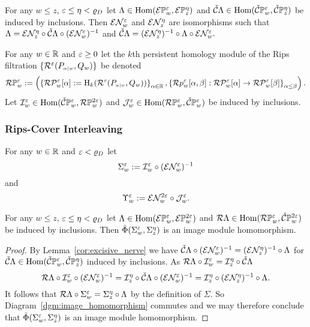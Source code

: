 \begin{lemma}\label{cor:excisive_nerve}
  For any $w\leq z$, $\e\leq \eta < \varrho_D$ let $\Lambda\in\Hom(\E\PP{w}{\e},\E\PP{z}{\eta})$ and $\cech\Lambda\in\Hom(\CPP{w}{\e},\CPP{z}{\eta})$ be induced by inclusions.
  Then $\E\N_w^\e$ and $\E\N_z^\eta$ are isomorphisms such that $\Lambda = \E\N_{z}^{\eta}\circ \cech\Lambda\circ (\E\N_w^\e)^{-1}$ and $\cech\Lambda = (\E\N_{z}^{\eta})^{-1}\circ \Lambda\circ \E\N_w^\e.$
\end{lemma}

For any $w\in\R$ and $\e\geq 0$ let the $k$th persistent homology module of the Rips filtration $\{\rips^\e(P\subi{w}{\alpha}, Q_w)\}$ be denoted
\[\RPP{w}{\e} := \left(\left\{\RP{w}{\e}{\alpha} := \hom_k(\rips^\e(P\subi{w}{\alpha}, Q_w))\right\}_{\alpha\in\R}, \left\{\rips p_w^\e[\alpha,\beta] : \RP{w}{\e}{\alpha}\to\RP{w}{\e}{\beta}\right\}_{\alpha\leq\beta}\right).\]
Let $\I_w^\e\in\Hom(\CPP{w}{\e}, \RPP{w}{2\e})$ and $\J_w^\e\in\Hom(\RPP{w}{\e},\CPP{w}{\e})$ be induced by inclusions.

\subsubsection{Rips-Cover Interleaving}

For any $w\in\R$ and $\e < \varrho_D$ let
\[\Sigma_w^\e := \I_w^\e\circ (\E\N_w^\e)^{-1}\]
and
\[\Upsilon_w^\e := \E\N_w^{2\e}\circ \J_w^{\e}.\]

\begin{lemma}\label{lem:rips_homomorphism_left}
  For any $w\leq z$, $\e\leq\eta < \varrho_D$ let $\Lambda\in\Hom(\ext{\PP{w}{\e}}, \ext{\PP{w}{2\e}})$ and $\rips\Lambda\in\Hom(\RPP{w}{\e},\CPP{w}{2\e})$ be induced by inclusions.
  Then $\tilde{\Phi}(\Sigma_w^\e,\Sigma_z^\eta)$ is an image module homomorphism.
\end{lemma}
\begin{proof}
  By Lemma~\ref{cor:excisive_nerve} we have $\cech\Lambda\circ (\E\N_w^\e)^{-1} = (\E\N_z^\eta)^{-1}\circ \Lambda$ for $\cech\Lambda\in\Hom(\CPP{w}{\e},\CPP{z}{\eta})$ induced by inclusions.
  As $\rips\Lambda\circ\I_w^\e = \I_z^\eta\circ\cech\Lambda$
  \[ \rips\Lambda\circ \I_w^\e\circ(\E\N_w^\e)^{-1} = \I_z^\eta\circ\cech\Lambda\circ (\E\N_w^\e)^{-1} = \I_z^\eta\circ (\E\N_z^\eta)^{-1}\circ\Lambda.\]
  It follows that $\rips\Lambda\circ\Sigma_w^\e = \Sigma_z^\eta\circ\Lambda$ by the definition of $\Sigma$.
  So Diagram~\ref{dgm:image_homomorphism} commutes and we may therefore conclude that $\tilde{\Phi}(\Sigma_w^\e,\Sigma_z^\eta)$ is an image module homomorphism.
\end{proof}

